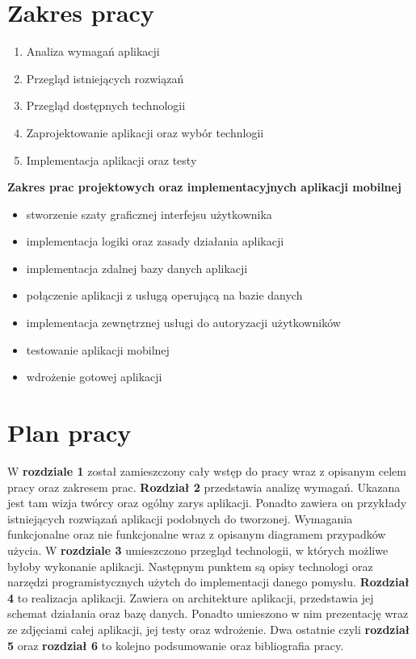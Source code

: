 \section{Zakres pracy}

\begin {enumerate}
\item Analiza wymagań aplikacji
\item Przegląd istniejących rozwiązań
\item Przegląd dostępnych technologii
\item Zaprojektowanie aplikacji oraz wybór technlogii
\item Implementacja aplikacji oraz testy
\end {enumerate}

\textbf{Zakres prac projektowych oraz implementacyjnych aplikacji mobilnej}

\begin {itemize}
\item stworzenie szaty graficznej interfejsu użytkownika
\item implementacja logiki oraz zasady działania aplikacji
\item implementacja zdalnej bazy danych aplikacji
\item połączenie aplikacji z usługą operującą na bazie danych
\item implementacja zewnętrznej usługi do autoryzacji użytkowników
\item testowanie aplikacji mobilnej
\item wdrożenie gotowej aplikacji
\end {itemize}

\section{Plan pracy}

W \textbf{rozdziale 1} został zamieszczony cały wstęp do pracy wraz z opisanym celem pracy oraz zakresem prac. \textbf{Rozdział 2} przedstawia analizę wymagań. Ukazana jest tam wizja twórcy oraz ogólny zarys aplikacji. Ponadto zawiera on przykłady istniejących rozwiązań aplikacji podobnych do tworzonej. Wymagania funkcjonalne oraz nie funkcjonalne wraz z opisanym diagramem przypadków użycia. W \textbf{rozdziale 3} umieszczono przegląd technologii, w których możliwe byłoby wykonanie aplikacji. Następnym punktem są opisy technologi oraz narzędzi programistycznych użytch do implementacji danego pomysłu. \textbf{Rozdział 4} to realizacja aplikacji. Zawiera on architekture aplikacji, przedstawia jej schemat działania oraz bazę danych. Ponadto umieszono w nim prezentację wraz ze zdjęciami całej aplikacji, jej testy oraz wdrożenie. Dwa ostatnie czyli \textbf{rozdział 5} oraz \textbf{rozdział 6} to kolejno podsumowanie oraz bibliografia pracy.